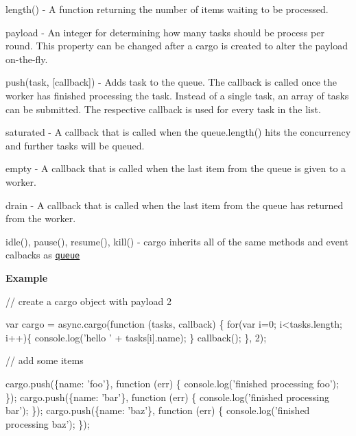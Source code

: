 \begin{DoxyItemize}
\item {\ttfamily length()} -\/ A function returning the number of items waiting to be processed.
\item {\ttfamily payload} -\/ An {\ttfamily integer} for determining how many tasks should be process per round. This property can be changed after a {\ttfamily cargo} is created to alter the payload on-\/the-\/fly.
\item {\ttfamily push(task, \mbox{[}callback\mbox{]})} -\/ Adds {\ttfamily task} to the {\ttfamily queue}. The callback is called once the {\ttfamily worker} has finished processing the task. Instead of a single task, an array of {\ttfamily tasks} can be submitted. The respective callback is used for every task in the list.
\item {\ttfamily saturated} -\/ A callback that is called when the {\ttfamily queue.\+length()} hits the concurrency and further tasks will be queued.
\item {\ttfamily empty} -\/ A callback that is called when the last item from the {\ttfamily queue} is given to a {\ttfamily worker}.
\item {\ttfamily drain} -\/ A callback that is called when the last item from the {\ttfamily queue} has returned from the {\ttfamily worker}.
\item {\ttfamily idle()}, {\ttfamily pause()}, {\ttfamily resume()}, {\ttfamily kill()} -\/ cargo inherits all of the same methods and event calbacks as \href{#queue}{\tt {\ttfamily queue}}
\end{DoxyItemize}

{\bfseries Example}


\begin{DoxyCode}
// create a cargo object with payload 2

var cargo = async.cargo(function (tasks, callback) \{
    for(var i=0; i<tasks.length; i++)\{
      console.log('hello ' + tasks[i].name);
    \}
    callback();
\}, 2);


// add some items

cargo.push(\{name: 'foo'\}, function (err) \{
    console.log('finished processing foo');
\});
cargo.push(\{name: 'bar'\}, function (err) \{
    console.log('finished processing bar');
\});
cargo.push(\{name: 'baz'\}, function (err) \{
    console.log('finished processing baz');
\});
\end{DoxyCode}
 



\label{_auto}%
